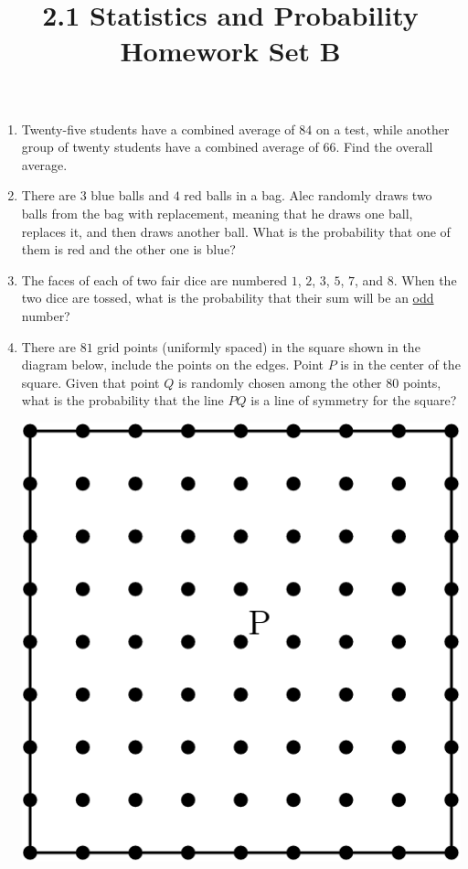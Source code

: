 \documentclass{article}
\title{2.1 Statistics and Probability Homework Set B}
\author{}
\date{}
\begin{document}
\maketitle
\begin{enumerate}
    \item Twenty-five students have a combined average of $84$ on a test, while
        another group of twenty students have a combined average of $66$. Find
        the overall average.
        \vspace{3cm}
    \item There are $3$ blue balls and $4$ red balls in a bag. Alec
        randomly draws two balls from the bag with replacement, meaning that
        he draws one ball, replaces it, and then draws another ball. What
        is the probability that one of them is red and the other one is
        blue?
    \vspace{3cm}
    \item The faces of each of two fair dice are numbered $1$, $2$, $3$, $5$, $7$, and $8$.
        When the two dice are tossed, what is the probability that their sum will be an \underline{odd} number?
        \vspace{3cm}
    \vspace{3cm}
    \item There are $81$ grid points (uniformly spaced) in the square shown in the diagram below, include the points on the edges.
        Point $P$ is in the center of the square.
        Given that point $Q$ is randomly chosen among the other $80$ points, what is the probability that the line $PQ$ is a line of symmetry for the square?
        \begin{center}
            \includegraphics[scale=0.25]{grid-points.png}

\end{center}
\end{enumerate}
\end{document}
